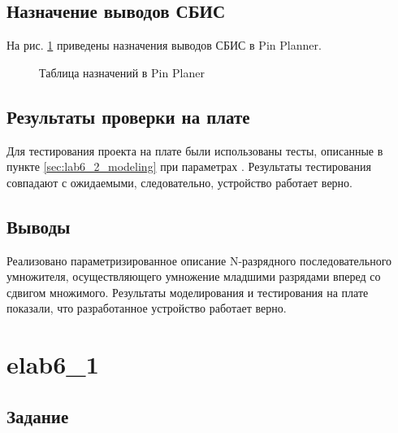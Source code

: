 \subsection{Назначение выводов СБИС}

На рис. \ref{fig:lab6_2_pins} приведены назначения выводов СБИС в Pin Planner.

\begin{figure}[H]
\begin{center}
	\caption{Таблица назначений в Pin Planer}
	\label{fig:lab6_2_pins}
\end{center}
\end{figure}

\subsection{Результаты проверки на плате}

Для тестирования проекта на плате были использованы тесты, описанные в пункте \ref{sec:lab6_2_modeling} при параметрах . Результаты тестирования совпадают с ожидаемыми, следовательно, устройство работает верно.

\subsection{Выводы}

Реализовано параметризированное описание N-разрядного последовательного умножителя, осуществляющего умножение младшими разрядами вперед со сдвигом множимого. Результаты моделирования и тестирования на плате показали, что разработанное устройство работает верно.

\newpage

\section{elab6\_1}

\subsection{Задание}

